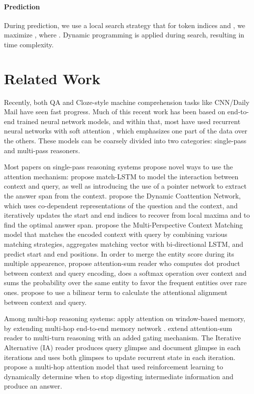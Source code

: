 \documentclass[11pt,letterpaper]{article}
\begin{document}
\paragraph{Prediction} During prediction, we use a local search strategy that for token indices  and , we maximize , where  . Dynamic programming is applied during search, resulting in  time complexity. 
 \section{Related Work}
Recently, both QA and Cloze-style machine comprehension tasks like CNN/Daily Mail have seen fast progress. Much of this recent work has been based on end-to-end trained neural network models, and within that, most have used recurrent neural networks with soft attention  \cite{attention_Bahdanau:2014vz}, which emphasizes one part of the data over the others. These models can be coarsely divided into two categories: single-pass and multi-pass reasoners.

Most papers on single-pass reasoning systems propose novel ways to use the attention mechanism:  propose match-LSTM to model the interaction between context and query, as well as introducing the use of a pointer network \cite{pointer_network_Vinyals:2015uw} to extract the answer span from the context.   propose the Dynamic Coattention Network, which uses co-dependent representations of the question and the context, and iteratively updates the start and end indices to recover from local maxima and to find the optimal answer span.  propose the Multi-Perspective Context Matching model that matches the encoded context with query by combining various matching strategies, aggregates matching vector with bi-directional LSTM, and predict start and end positions. In order to merge the entity score during its multiple appearence,  propose attention-sum reader who computes dot product between context and query encoding, does a softmax operation over context and sums the probability over the same entity to favor the frequent entities over rare ones.  propose to use a bilinear term to calculate the attentional alignment between context and query.

Among multi-hop reasoning systems:  apply attention on window-based memory, by extending multi-hop end-to-end memory network \cite{memN2N_Sukhbaatar:2015ww}.  extend attention-sum reader to multi-turn reasoning with an added gating mechanism. The Iterative Alternative (IA) reader \cite{Sordoni:2016wb} produces query glimpse and document glimpse in each iterations and uses both glimpses to update recurrent state in each iteration.  propose a multi-hop attention model that used reinforcement learning to dynamically determine when to stop digesting intermediate information and produce an answer.
 
\end{document}
